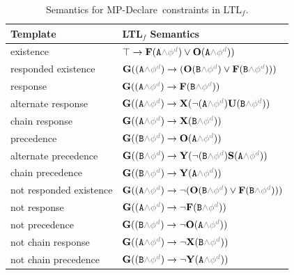 \begin{table}[t!]
\caption{Semantics for MP-Declare\ constraints in LTL$_f$. \label{tbl:timed-mfotl}}
\centering
\scriptsize{
\begin{tabular}{ll}
\toprule
\textbf{Template} & \textbf{LTL$_f$ Semantics} \\
\midrule
existence & $\top \rightarrow \lfuture (\texttt{A} \textcolor{gray}{\wedge \phi^d}) \vee \lonce (\texttt{A} \textcolor{gray}{\wedge \phi^d}))$ \\
\midrule
responded existence  & $\lglobally( (\texttt{A} \textcolor{gray}{\wedge \phi^d}) \rightarrow (\lonce (\texttt{B} \textcolor{gray}{\wedge \phi^d}) \vee \lfuture (\texttt{B} \textcolor{gray}{\wedge \phi^d})))$ \\
\midrule
response &  $\lglobally(  (\texttt{A} \textcolor{gray}{\wedge \phi^d}) \rightarrow \lfuture (\texttt{B} \textcolor{gray}{\wedge \phi^d}))$ \\
alternate response  & $ \lglobally( (\texttt{A} \textcolor{gray}{\wedge \phi^d}) \rightarrow \lnext(\neg (\texttt{A} \textcolor{gray}{\wedge \phi^d}) \luntil (\texttt{B} \textcolor{gray}{\wedge \phi^d}))$ \\
chain response &  $\lglobally( (\texttt{A} \textcolor{gray}{\wedge \phi^d}) \rightarrow \lnext (\texttt{B} \textcolor{gray}{\wedge \phi^d}))$ \\
\midrule
precedence &  $\lglobally( (\texttt{B} \textcolor{gray}{\wedge \phi^d}) \rightarrow \lonce (\texttt{A} \textcolor{gray}{\wedge \phi^d}))$ \\
alternate precedence & $ \lglobally( (\texttt{B} \textcolor{gray}{\wedge \phi^d}) \rightarrow \lyesterday(\neg (\texttt{B} \textcolor{gray}{\wedge \phi^d}) \lsince (\texttt{A} \textcolor{gray}{\wedge \phi^d}))$ \\
chain precedence & $\lglobally( (\texttt{B} \textcolor{gray}{\wedge \phi^d}) \rightarrow \lyesterday (\texttt{A} \textcolor{gray}{\wedge \phi^d}))$ \\
\midrule
not responded existence  &
$\lglobally( (\texttt{A} \textcolor{gray}{\wedge \phi^d}) \rightarrow \neg (\lonce (\texttt{B}   \textcolor{gray}{\wedge \phi^d}) \vee \lfuture (\texttt{B} \textcolor{gray}{\wedge \phi^d})))$ \\
not response  & $\lglobally(  (\texttt{A} \textcolor{gray}{\wedge \phi^d}) \rightarrow \neg \lfuture (\texttt{B} \textcolor{gray}{\wedge \phi^d}))$ \\
not precedence & $\lglobally( (\texttt{B} \textcolor{gray}{\wedge \phi^d}) \rightarrow \neg \lonce (\texttt{A} \textcolor{gray}{\wedge \phi^d}))$ \\
not chain response  & $\lglobally( (\texttt{A} \textcolor{gray}{\wedge \phi^d}) \rightarrow \neg \lnext (\texttt{B} \textcolor{gray}{\wedge \phi^d}))$ \\
not chain precedence  & $\lglobally( (\texttt{B} \textcolor{gray}{\wedge \phi^d}) \rightarrow \neg \lyesterday (\texttt{A} \textcolor{gray}{\wedge \phi^d}))$ \\
\bottomrule
\end{tabular}}
\end{table}





